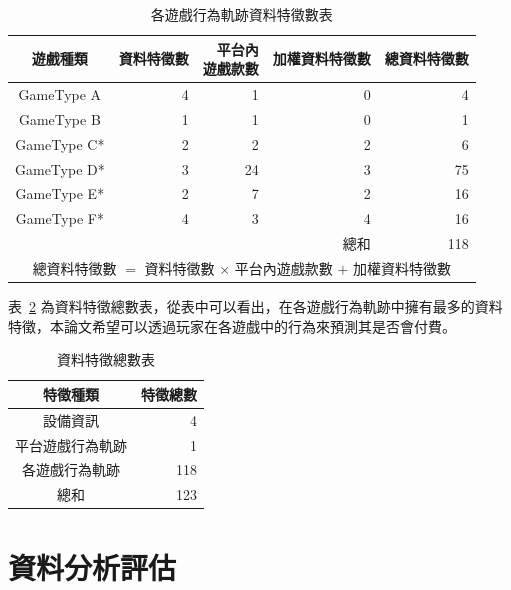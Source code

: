 \begin{table}[!htb]
    \centering
    \begin{tabular}{crrrr}
    \hline \hline
    遊戲種類 & 資料特徵數 & \tabincell{r}{平台內\\遊戲款數} & 加權資料特徵數 & 總資料特徵數 \\
    \hline \hline
    GameType A & 4 & 1 & 0 & 4 \\
    \hline
    GameType B & 1 & 1 & 0 & 1 \\
    \hline
    GameType C* & 2 & 2 & 2 & 6 \\
    \hline
    GameType D* & 3 & 24 & 3 & 75 \\
    \hline
    GameType E* & 2 & 7 & 2 & 16 \\
    \hline
    GameType F* & 4 & 3 & 4 & 16 \\
    \hline
    &&& \cellcolor[HTML]{C0C0C0}總和 & \cellcolor[HTML]{C0C0C0}118 \\
    \hline
    \multicolumn{5}{c}{總資料特徵數 $=$ 資料特徵數 $\times$ 平台內遊戲款數 $+$ 加權資料特徵數} \\
    \hline \hline
    \end{tabular}
    \caption[各遊戲行為軌跡資料特徵數表]{各遊戲行為軌跡資料特徵數表}
    \label{tab:NumberOfGamesFeatures}
\end{table}

表~\ref{tab:NumberOfFeatures} 為資料特徵總數表，從表中可以看出，在各遊戲行為軌跡中擁有最多的資料特徵，本論文希望可以透過玩家在各遊戲中的行為來預測其是否會付費。

\begin{table}[!htb]
	\centering
	\begin{tabular}{cr}
	\hline \hline
	特徵種類 & 特徵總數 \\
    \hline \hline
    設備資訊 & 4 \\
    \hline
    平台遊戲行為軌跡 & 1 \\
    \hline
    各遊戲行為軌跡 & 118 \\
    \hline
    \cellcolor[HTML]{C0C0C0}總和 & \cellcolor[HTML]{C0C0C0}123 \\
    \hline \hline
	\end{tabular}
	\caption[資料特徵總數表]{資料特徵總數表}
	\label{tab:NumberOfFeatures}
\end{table}
\newpage

\section{資料分析評估}
\label{sec:DataAnalysisEvaluation}

